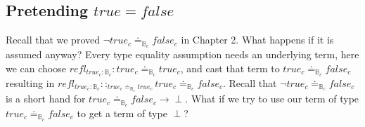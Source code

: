 \subsection{Pretending $true=false$}

Recall that we proved $\lnot true_{c}\doteq_{\mathbb{B}_{c}}false_{c}$ in Chapter 2.
What happens if it is assumed anyway?
Every type equality assumption needs an underlying term, here we can choose $refl_{true_{c}:\mathbb{B}_{c}}:true_{c}\doteq_{\mathbb{B}_{c}}true_{c}$, and cast that term to $true_{c}\doteq_{\mathbb{B}_{c}}false_{c}$ resulting in $refl_{true_{c}:\mathbb{B}_{c}}::_{true_{c}\doteq_{\mathbb{B}_{c}}true_{c}}true_{c}\doteq_{\mathbb{B}_{c}}false_{c}$.
Recall that $\lnot true_{c}\doteq_{\mathbb{B}_{c}}false_{c}$ is a short hand for $true_{c}\doteq_{\mathbb{B}_{c}}false_{c}\rightarrow\perp$.
What if we try to use our term of type $true_{c}\doteq_{\mathbb{B}_{c}}false_{c}$ to get a term of type $\perp$?

